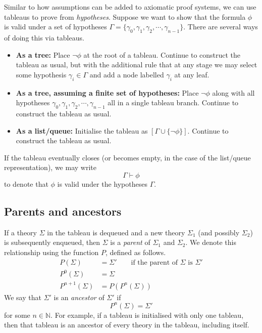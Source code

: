 Similar to how assumptions can be added to axiomatic proof systems, we can use tableaus to prove from \emph{hypotheses}. Suppose we want to show that the formula \(\phi\) is valid under a set of hypotheses \(\Gamma = \{\gamma_0, \gamma_1, \gamma_2, \cdots, \gamma_{n-1}\}\). There are several ways of doing this via tableaus.
%
\begin{itemize}
    \item \textbf{As a tree:} Place \(\neg\phi\) at the root of a tableau. Continue to construct the tableau as usual, but with the additional rule that at any stage we may select some hypothesis \(\gamma_i \in \Gamma\) and add a node labelled \(\gamma_i\) at any leaf.
    \item \textbf{As a tree, assuming a finite set of hypotheses:} Place \(\neg\phi\) along with all hypotheses \(\gamma_0, \gamma_1, \gamma_2, \cdots, \gamma_{n-1}\) all in a single tableau branch. Continue to construct the tableau as usual.
    \item \textbf{As a list/queue:} Initialise the tableau as \([\Gamma\cup\{\neg\phi\}]\). Continue to construct the tableau as usual.
\end{itemize}
%
If the tableau eventually closes (or becomes empty, in the case of the list/queue representation), we may write
%
\[\Gamma\vdash\phi\]
%
to denote that \(\phi\) is valid under the hypotheses \(\Gamma\).




\subsection{Parents and ancestors}

If a theory \(\Sigma\) in the tableau is dequeued and a new theory \(\Sigma_1\) (and possibly \(\Sigma_2\)) is subsequently enqueued, then \(\Sigma\) is a \emph{parent} of \(\Sigma_1\) and \(\Sigma_2\). We denote this relationship using the function \(P\), defined as follows.
%
\begin{align*}
    P(\Sigma) &= \Sigma' \hspace{2em} \text{if the parent of } \Sigma \text{ is } \Sigma'\\
    P^0(\Sigma) &= \Sigma\\
    P^{n+1} (\Sigma) &= P(P^n (\Sigma))
\end{align*}
%
We say that \(\Sigma'\) is an \emph{ancestor} of \(\Sigma'\) if
%
\[P^n (\Sigma) = \Sigma'\]
%
for some \(n \in \mathbb{N}\). For example, if a tableau is initialised with only one tableau, then that tableau is an ancestor of every theory in the tableau, including itself.



